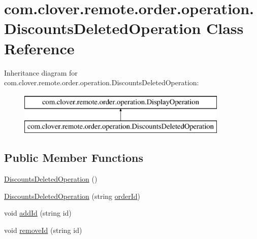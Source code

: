\hypertarget{classcom_1_1clover_1_1remote_1_1order_1_1operation_1_1_discounts_deleted_operation}{}\section{com.\+clover.\+remote.\+order.\+operation.\+Discounts\+Deleted\+Operation Class Reference}
\label{classcom_1_1clover_1_1remote_1_1order_1_1operation_1_1_discounts_deleted_operation}
Inheritance diagram for com.\+clover.\+remote.\+order.\+operation.\+Discounts\+Deleted\+Operation\+:\begin{figure}[H]
\begin{center}
\leavevmode
\includegraphics[height=2.000000cm]{classcom_1_1clover_1_1remote_1_1order_1_1operation_1_1_discounts_deleted_operation}
\end{center}
\end{figure}
\subsection*{Public Member Functions}
\begin{DoxyCompactItemize}
\item 
\hyperlink{classcom_1_1clover_1_1remote_1_1order_1_1operation_1_1_discounts_deleted_operation_ae3a0f29f218a53da8a4b2973a67837e8}{Discounts\+Deleted\+Operation} ()
\item 
\hyperlink{classcom_1_1clover_1_1remote_1_1order_1_1operation_1_1_discounts_deleted_operation_abab94ca1f7408cc8fa41134280714ad5}{Discounts\+Deleted\+Operation} (string \hyperlink{classcom_1_1clover_1_1remote_1_1order_1_1operation_1_1_discounts_deleted_operation_a0a18d8ad82ea9ac7aa64f5338bb624d8}{order\+Id})
\item 
void \hyperlink{classcom_1_1clover_1_1remote_1_1order_1_1operation_1_1_discounts_deleted_operation_a7529cca2b8d45d61d0e657ba1103cf13}{add\+Id} (string id)
\item 
void \hyperlink{classcom_1_1clover_1_1remote_1_1order_1_1operation_1_1_discounts_deleted_operation_aa7354972209cd5258b5610471ba8fc26}{remove\+Id} (string id)
\end{DoxyCompactItemize}
